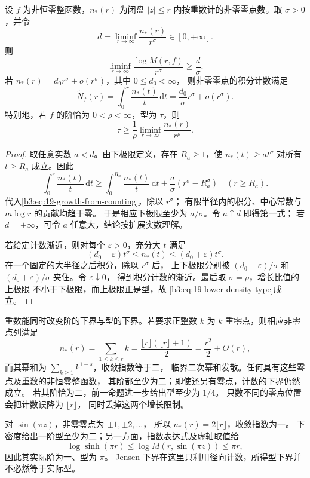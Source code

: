 \begin{proposition}[零点下密度与增长下界]\label{b3:prop:19-lower-density}
设 \(f\) 为非恒零整函数，\(n_*(r)\) 为闭盘 \(|z|\le r\)
内按重数计的非零零点数。取 \(\sigma>0\)，并令
\[
 d=\liminf_{r\to\infty}\frac{n_*(r)}{r^\sigma}\in[0,+\infty].
\]
则
\[
 \liminf_{r\to\infty}\frac{\log M(r,f)}{r^\sigma}\ge\frac d\sigma.
\]
若 \(n_*(r)=d_0r^\sigma+o(r^\sigma)\)，其中 \(0\le d_0<\infty\)，
则非零零点的积分计数满足
\[
 \widetilde N_f(r)=\int_0^r\frac{n_*(t)}t\,\mathrm dt
 =\frac{d_0}{\sigma}r^\sigma+o(r^\sigma).
\]
特别地，若 \(f\) 的阶恰为 \(0<\rho<\infty\)，型为 \(\tau\)，则
\begin{equation}\label{b3:eq:19-lower-density-type}
 \tau\ge\frac1\rho
       \liminf_{r\to\infty}\frac{n_*(r)}{r^\rho}.
\end{equation}
\end{proposition}
\begin{proof}
取任意实数 \(a<d\)。由下极限定义，存在 \(R_a\ge1\)，使
\(n_*(t)\ge at^\sigma\) 对所有 \(t\ge R_a\) 成立。因此
\[
 \int_0^r\frac{n_*(t)}t\,\mathrm dt
 \ge\int_0^{R_a}\frac{n_*(t)}t\,\mathrm dt
       +\frac a\sigma(r^\sigma-R_a^\sigma)
 \quad(r\ge R_a).
\]
代入\eqref{b3:eq:19-growth-from-counting}，除以 \(r^\sigma\)；
有限半径内的积分、中心常数与 \(m\log r\) 的贡献均趋于零。
于是相应下极限至少为 \(a/\sigma\)。令 \(a\uparrow d\) 即得第一式；
若 \(d=+\infty\)，可令 \(a\) 任意大，结论按扩展实数理解。

若给定计数渐近，则对每个 \(\varepsilon>0\)，充分大 \(t\) 满足
\[
 (d_0-\varepsilon)t^\sigma\le n_*(t)
             \le(d_0+\varepsilon)t^\sigma.
\]
在一个固定的大半径之后积分，除以 \(r^\sigma\) 后，
上下极限分别被 \((d_0-\varepsilon)/\sigma\) 和
\((d_0+\varepsilon)/\sigma\) 夹住。令 \(\varepsilon\downarrow0\)，
得到积分计数的渐近。最后取 \(\sigma=\rho\)，增长比值的上极限
不小于下极限，而上极限正是型，故
\eqref{b3:eq:19-lower-density-type}成立。
\end{proof}

重数能同时改变阶的下界与型的下界。若要求正整数 \(k\) 为
\(k\) 重零点，则相应非零点列满足
\[
 n_*(r)=\sum_{1\le k\le r}k
 =\frac{\lfloor r\rfloor(\lfloor r\rfloor+1)}2
 =\frac{r^2}2+O(r),
\]
而其幂和为 \(\sum_{k\ge1}k^{1-s}\)，收敛指数等于二，
临界二次幂和发散。任何具有这些零点及重数的非恒零整函数，
其阶都至少为二；即使还另有零点，计数的下界仍然成立。
若其阶恰为二，前一命题进一步给出型至少为 \(1/4\)。
只数不同的零点位置会把计数误降为 \(\lfloor r\rfloor\)，
同时丢掉这两个增长限制。

\ProseParagraphBreak
对 \(\sin(\pi z)\)，非零零点为 \(\pm1,\pm2,\ldots\)，
所以 \(n_*(r)=2\lfloor r\rfloor\)，收敛指数为一。
下密度给出一阶型至少为二；另一方面，指数表达式及虚轴取值给
\[
 \log\sinh(\pi r)\le\log M(r,\sin(\pi z))\le\pi r,
\]
因此其实际阶为一、型为 \(\pi\)。
Jensen 下界在这里只利用径向计数，所得型下界并不必然等于实际型。

